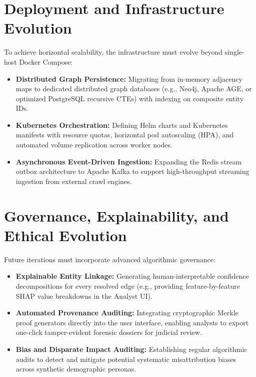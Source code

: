 \section{Deployment and Infrastructure Evolution}
\label{sec:future-deployment}
To achieve horizontal scalability, the infrastructure must evolve beyond single-host Docker Compose:
\begin{itemize}
    \item \textbf{Distributed Graph Persistence:} Migrating from in-memory adjacency maps to dedicated distributed graph databases (e.g., Neo4j, Apache AGE, or optimized PostgreSQL recursive CTEs) with indexing on composite entity IDs.
    \item \textbf{Kubernetes Orchestration:} Defining Helm charts and Kubernetes manifests with resource quotas, horizontal pod autoscaling (HPA), and automated volume replication across worker nodes.
    \item \textbf{Asynchronous Event-Driven Ingestion:} Expanding the Redis stream outbox architecture to Apache Kafka to support high-throughput streaming ingestion from external crawl engines.
\end{itemize}

\section{Governance, Explainability, and Ethical Evolution}
\label{sec:future-governance}
Future iterations must incorporate advanced algorithmic governance:
\begin{itemize}
    \item \textbf{Explainable Entity Linkage:} Generating human-interpretable confidence decompositions for every resolved edge (e.g., providing feature-by-feature SHAP value breakdowns in the Analyst UI).
    \item \textbf{Automated Provenance Auditing:} Integrating cryptographic Merkle proof generators directly into the user interface, enabling analysts to export one-click tamper-evident forensic dossiers for judicial review.
    \item \textbf{Bias and Disparate Impact Auditing:} Establishing regular algorithmic audits to detect and mitigate potential systematic misattribution biases across synthetic demographic personas.
\end{itemize}

